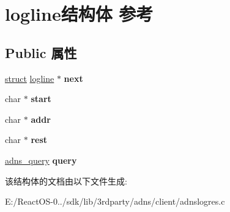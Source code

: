 \hypertarget{structlogline}{}\section{logline结构体 参考}
\label{structlogline}
\subsection*{Public 属性}
\begin{DoxyCompactItemize}
\item 
\mbox{\label{structlogline_a208c093f77863e207f36ff8734ee1d85}} 
\hyperlink{interfacestruct}{struct} \hyperlink{structlogline}{logline} $\ast$ {\bfseries next}
\item 
\mbox{\label{structlogline_a96bf9d2d161b001e1a345034e6ad5455}} 
char $\ast$ {\bfseries start}
\item 
\mbox{\label{structlogline_a793b1e2f0356b86aa959ba6256b643ff}} 
char $\ast$ {\bfseries addr}
\item 
\mbox{\label{structlogline_aa74529dd03676abe15c477f6a32b9da4}} 
char $\ast$ {\bfseries rest}
\item 
\mbox{\label{structlogline_a2bef1d544ff10af943c706d06b75ac2e}} 
\hyperlink{structadns____query}{adns\+\_\+query} {\bfseries query}
\end{DoxyCompactItemize}


该结构体的文档由以下文件生成\+:\begin{DoxyCompactItemize}
\item 
E\+:/\+React\+O\+S-\/0../sdk/lib/3rdparty/adns/client/adnslogres.\+c\end{DoxyCompactItemize}
